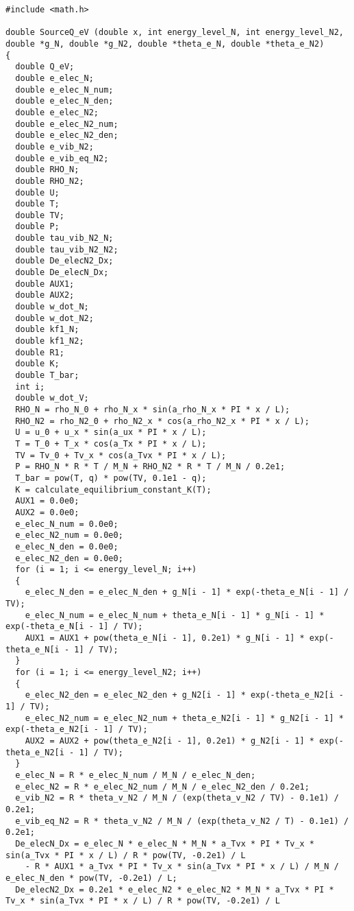 \documentclass[10pt]{article}
\begin{document}
\begin{scriptsize} 
\begin{verbatim}
#include <math.h>

double SourceQ_eV (double x, int energy_level_N, int energy_level_N2, double *g_N, double *g_N2, double *theta_e_N, double *theta_e_N2)
{
  double Q_eV;
  double e_elec_N;
  double e_elec_N_num;
  double e_elec_N_den;
  double e_elec_N2;
  double e_elec_N2_num;
  double e_elec_N2_den;
  double e_vib_N2;
  double e_vib_eq_N2;
  double RHO_N;
  double RHO_N2;
  double U;
  double T;
  double TV;
  double P;
  double tau_vib_N2_N;
  double tau_vib_N2_N2;
  double De_elecN2_Dx;
  double De_elecN_Dx;
  double AUX1;
  double AUX2;
  double w_dot_N;
  double w_dot_N2;
  double kf1_N;
  double kf1_N2;
  double R1;
  double K;
  double T_bar;
  int i;
  double w_dot_V;
  RHO_N = rho_N_0 + rho_N_x * sin(a_rho_N_x * PI * x / L);
  RHO_N2 = rho_N2_0 + rho_N2_x * cos(a_rho_N2_x * PI * x / L);
  U = u_0 + u_x * sin(a_ux * PI * x / L);
  T = T_0 + T_x * cos(a_Tx * PI * x / L);
  TV = Tv_0 + Tv_x * cos(a_Tvx * PI * x / L);
  P = RHO_N * R * T / M_N + RHO_N2 * R * T / M_N / 0.2e1;
  T_bar = pow(T, q) * pow(TV, 0.1e1 - q);
  K = calculate_equilibrium_constant_K(T);
  AUX1 = 0.0e0;
  AUX2 = 0.0e0;
  e_elec_N_num = 0.0e0;
  e_elec_N2_num = 0.0e0;
  e_elec_N_den = 0.0e0;
  e_elec_N2_den = 0.0e0;
  for (i = 1; i <= energy_level_N; i++)
  {
    e_elec_N_den = e_elec_N_den + g_N[i - 1] * exp(-theta_e_N[i - 1] / TV);
    e_elec_N_num = e_elec_N_num + theta_e_N[i - 1] * g_N[i - 1] * exp(-theta_e_N[i - 1] / TV);
    AUX1 = AUX1 + pow(theta_e_N[i - 1], 0.2e1) * g_N[i - 1] * exp(-theta_e_N[i - 1] / TV);
  }
  for (i = 1; i <= energy_level_N2; i++)
  {
    e_elec_N2_den = e_elec_N2_den + g_N2[i - 1] * exp(-theta_e_N2[i - 1] / TV);
    e_elec_N2_num = e_elec_N2_num + theta_e_N2[i - 1] * g_N2[i - 1] * exp(-theta_e_N2[i - 1] / TV);
    AUX2 = AUX2 + pow(theta_e_N2[i - 1], 0.2e1) * g_N2[i - 1] * exp(-theta_e_N2[i - 1] / TV);
  }
  e_elec_N = R * e_elec_N_num / M_N / e_elec_N_den;
  e_elec_N2 = R * e_elec_N2_num / M_N / e_elec_N2_den / 0.2e1;
  e_vib_N2 = R * theta_v_N2 / M_N / (exp(theta_v_N2 / TV) - 0.1e1) / 0.2e1;
  e_vib_eq_N2 = R * theta_v_N2 / M_N / (exp(theta_v_N2 / T) - 0.1e1) / 0.2e1;
  De_elecN_Dx = e_elec_N * e_elec_N * M_N * a_Tvx * PI * Tv_x * sin(a_Tvx * PI * x / L) / R * pow(TV, -0.2e1) / L 
    - R * AUX1 * a_Tvx * PI * Tv_x * sin(a_Tvx * PI * x / L) / M_N / e_elec_N_den * pow(TV, -0.2e1) / L;
  De_elecN2_Dx = 0.2e1 * e_elec_N2 * e_elec_N2 * M_N * a_Tvx * PI * Tv_x * sin(a_Tvx * PI * x / L) / R * pow(TV, -0.2e1) / L 

\end{verbatim}
\end{scriptsize}
\end{document}
